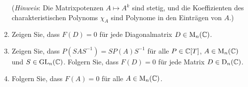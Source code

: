 \begin{question}
\begin{enumerate}[resume]
      (\emph{Hinweis}: Die Matrixpotenzen $A \mapsto A^k$ sind stetig, und die Koeffizienten des charakteristischen Polynoms $\chi_A$ sind Polynome in den Einträgen von $A$.)
      
    \item
      Zeigen Sie, dass $F(D) = 0$ für jede Diagonalmatrix $D \in \operatorname{M}_n(\mathbb{C})$.
    \item
      Zeigen Sie, dass $P(SAS^{-1}) = S P(A) S^{-1}$ für alle $P \in \mathbb{C}[T]$, $A \in \operatorname{M}_n(\mathbb{C})$ und $S \in \operatorname{GL}_n(\mathbb{C})$.
      Folgern Sie, dass $F(D) = 0$ für jede Matrix $D \in \operatorname{D}_n(\mathbb{C})$.
    \item
      Folgern Sie, dass $F(A) = 0$ für alle $A \in \operatorname{M}_n(\mathbb{C})$.
  \end{enumerate}
\end{question}